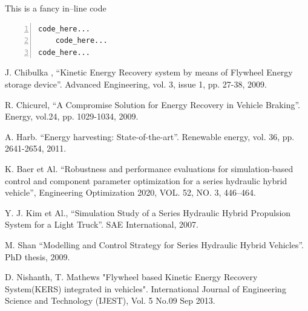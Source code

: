 \documentclass[11pt]{article}
\begin{document}

\vspace{4cm}
This is a fancy in--line code
\singlespacing
\begin{Verbatim}[tabsize = 4, frame = lines, numbers = left]
code_here...
	code_here...
code_here...
\end{Verbatim}
\onehalfspacing


\begin{thebibliography}{60}
	
	
	
	
	
	J. Chibulka , “Kinetic Energy Recovery system by means of Flywheel Energy 		    storage device”. 
	Advanced Engineering, vol. 3, issue 1, pp. 27-38, 2009.
	
	R. Chicurel, “A Compromise Solution for Energy Recovery in Vehicle Braking”.      	Energy, vol.24, pp. 1029-1034, 2009.
	
	A. Harb. “Energy harvesting: State-of-the-art”. 
	Renewable energy, vol. 36, pp. 2641-2654, 2011.
	
	K. Baer et Al. “Robustness and performance evaluations for simulation-based 		control and component parameter optimization for a series hydraulic hybrid 			vehicle”,  Engineering Optimization 2020, VOL. 52, NO. 3, 446–464.	
	
	Y. J. Kim et Al., “Simulation Study of a Series Hydraulic Hybrid Propulsion 		System for a Light Truck”. SAE International, 2007.
	
	M. Shan “Modelling and Control Strategy for Series Hydraulic Hybrid 				Vehicles”.  PhD thesis, 2009.
	
	D. Nishanth, T. Mathews "Flywheel based Kinetic Energy Recovery System(KERS) integrated in vehicles". International Journal of Engineering Science and Technology (IJEST), Vol. 5 No.09 Sep 2013.
	

\end{thebibliography}
\end{document}
